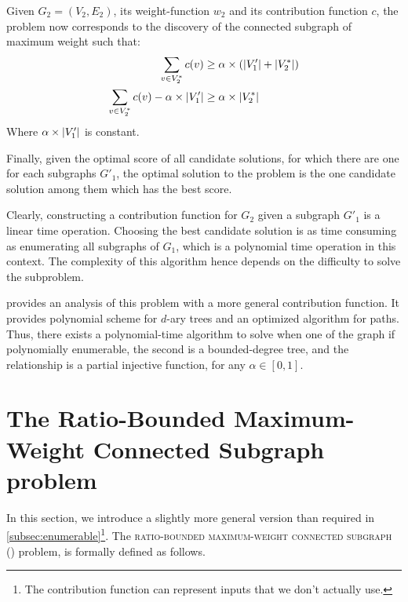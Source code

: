 			Given $G_2=(V_2,E_2)$, its weight-function $w_2$ and its contribution function $c$, the problem now corresponds to the discovery of the connected subgraph of maximum weight such that:
			\begin{align*}
				\sum_{v \in V^*_2}{c(v)}                           &\geq \alpha\times\left(\lvert V'_1\rvert + \lvert V^*_2\rvert\right) \\
				\sum_{v \in V^*_2}{c(v)} - \alpha\times\lvert V'_1\rvert &\geq \alpha\times\lvert V^*_2\rvert
			\end{align*}
			Where $\alpha\times\lvert V_1'\rvert$ is constant.

			Finally, given the optimal score of all candidate solutions, for which there are one for each subgraphs $G'_1$, the optimal solution to the \mwccs{} problem is the one candidate solution among them which has the best score.

			Clearly, constructing a contribution function for $G_2$ given a subgraph $G'_1$ is a linear time operation.
			Choosing the best candidate solution is as time consuming as enumerating all subgraphs of $G_1$, which is a polynomial time operation in this context.
			The complexity of this algorithm hence depends on the difficulty to solve the \rbmwcs{} subproblem.

			 provides an analysis of this problem with a more general contribution function.
			It provides polynomial scheme for $d$-ary trees and an optimized algorithm for paths.
			Thus, there exists a polynomial-time algorithm to solve \mwccs{} when one of the graph if polynomially enumerable, the second is a bounded-degree tree, and the relationship is a partial injective function, for any $\alpha \in [0, 1]$.

	\section{The Ratio-Bounded Maximum-Weight Connected Subgraph problem}
	\label{sec:rbmwcs}

		In this section, we introduce a slightly more general version than required in \cref{subsec:enumerable}\footnote{The contribution function can represent inputs that we don't actually use.}.
		The \textsc{ratio-bounded maximum-weight connected subgraph} (\rbmwcs) problem, is formally defined as follows.

